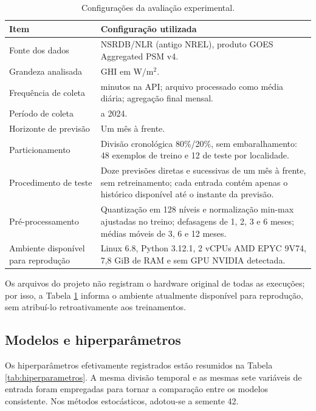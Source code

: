 \documentclass[11pt,a4paper]{article}
\begin{document}
\begin{table}[htbp]
\centering
\caption{Configurações da avaliação experimental.}
\label{tab:configuracao}
\begingroup
\small
\setlength{\tabcolsep}{4pt}
\renewcommand{\arraystretch}{1.06}
\begin{tabular}{>{\raggedright\arraybackslash}p{3.8cm}>{\raggedright\arraybackslash}p{10.8cm}}
\toprule
\textbf{Item} & \textbf{Configuração utilizada} \\
\midrule
Fonte dos dados & NSRDB/NLR (antigo NREL), produto GOES Aggregated PSM v4. \\
Grandeza analisada & GHI em W/m$^2$. \\
Frequência de coleta & 60 minutos na API; arquivo processado como média diária; agregação final mensal. \\
Período de coleta & 2019 a 2024. \\
Horizonte de previsão & Um mês à frente. \\
Particionamento & Divisão cronológica 80\%/20\%, sem embaralhamento: 48 exemplos de treino e 12 de teste por localidade. \\
Procedimento de teste & Doze previsões diretas e sucessivas de um mês à frente, sem retreinamento; cada entrada contém apenas o histórico disponível até o instante da previsão. \\
Pré-processamento & Quantização em 128 níveis e normalização min-max ajustadas no treino; defasagens de 1, 2, 3 e 6 meses; médias móveis de 3, 6 e 12 meses. \\
Ambiente disponível para reprodução & Linux 6.8, Python 3.12.1, 2 vCPUs AMD EPYC 9V74, 7,8 GiB de RAM e sem GPU NVIDIA detectada. \\
\bottomrule
\end{tabular}
\endgroup
\end{table}

Os arquivos do projeto não registram o hardware original de todas as execuções; por isso, a Tabela \ref{tab:configuracao} informa o ambiente atualmente disponível para reprodução, sem atribuí-lo retroativamente aos treinamentos.

\subsection{Modelos e hiperparâmetros}

Os hiperparâmetros efetivamente registrados estão resumidos na Tabela \ref{tab:hiperparametros}. A mesma divisão temporal e as mesmas sete variáveis de entrada foram empregadas para tornar a comparação entre os modelos consistente. Nos métodos estocásticos, adotou-se a semente 42.
\end{document}

